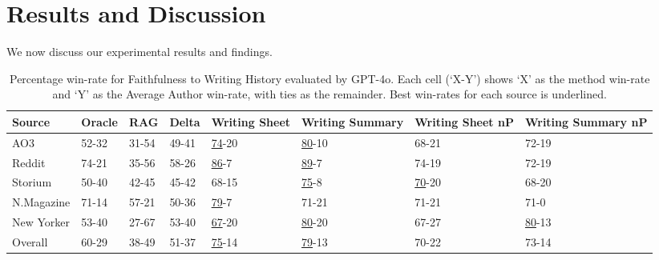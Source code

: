 \section{Results and Discussion}
We now discuss our experimental results and findings. 

\begin{table*}[htbp]
\centering
\caption{Percentage win-rate for Faithfulness to Writing History evaluated by GPT-4o. Each cell (`X-Y') shows `X' as the method win-rate and `Y' as the Average Author win-rate, with ties as the remainder. Best win-rates for each source is underlined.}
\label{tab:faith-auth-history}
\small
\begin{tabular}{p{2cm} p{1.5cm} p{1.5cm} p{1.5cm} p{1.5cm} p{1.5cm} p{1.5cm} p{1.75cm}}
\toprule
\textbf{Source} & \textbf{Oracle} & \textbf{RAG} & \textbf{Delta} & \textbf{Writing Sheet} & \textbf{Writing Summary} & \textbf{Writing Sheet nP} & \textbf{Writing Summary nP} \\
\midrule
AO3 & 52-32 & 31-54 & 49-41 & \underline{74}-20 & \underline{80}-10 & 68-21 & 72-19 \\
Reddit & 74-21 & 35-56 & 58-26 & \underline{86}-7 & \underline{89}-7 & 74-19 & 72-19 \\
Storium & 50-40 & 42-45 & 45-42 & 68-15 & \underline{75}-8 & \underline{70}-20 & 68-20 \\
N.Magazine & 71-14 & 57-21 & 50-36 & \underline{79}-7 & 71-21 & 71-21 & 71-0 \\
New Yorker & 53-40 & 27-67 & 53-40 & \underline{67}-20 & \underline{80}-20 & 67-27 & \underline{80}-13 \\
Overall & 60-29 & 38-49 & 51-37 & \underline{75}-14 & \underline{79}-13 & 70-22 & 73-14 \\
\bottomrule
\end{tabular}
\end{table*}

